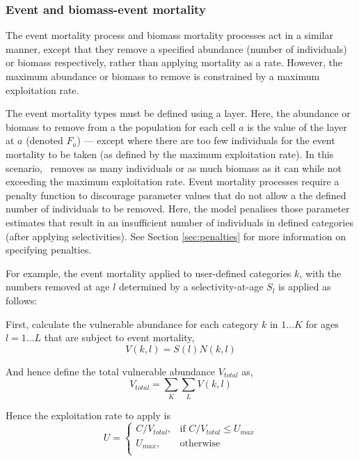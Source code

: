 \subsubsection*{Event and biomass-event mortality}

The event mortality process and biomass mortality processes act in a similar manner, except that they remove a specified abundance (number of individuals) or biomass respectively, rather than applying mortality as a rate. However, the maximum abundance or biomass to remove is constrained by a maximum exploitation rate.

The event mortality types must be defined using a layer. Here, the abundance or biomass to remove from a the population for each cell $a$ is the value of the layer at $a$ (denoted $F_a$) --- except where there are too few individuals for the event mortality to be taken (as defined by the maximum exploitation rate). In this scenario, \SPM\ removes as many individuals or as much biomass as it can while not exceeding the maximum exploitation rate. Event mortality processes require a penalty function to discourage parameter values that do not allow a the defined number of individuals to be removed. Here, the model penalises those parameter estimates that result in an insufficient number of individuals in defined categories (after applying selectivities). See Section \ref{sec:penalties} for more information on specifying penalties.

For example, the event mortality applied to user-defined categories $k$, with the numbers removed at age $l$ determined by a selectivity-at-age $S_l$ is applied as follows:

First, calculate the vulnerable abundance for each category $k$ in $1 \ldots K$ for ages $l = 1 \ldots L$ that are subject to event mortality,
\begin{equation}
  V(k,l) = S(l) N(k,l)
\end{equation}

And hence define the total vulnerable abundance $V_{total}$ as,
\begin{equation}
  V_{total}  = \sum\limits_K {\sum\limits_L {V(k,l)}} 
\end{equation}

Hence the exploitation rate to apply is 
\begin{equation}
U = \begin{cases}
  C/V_{total}, & \text{if $C/V_{total} \leq U_{max}$} \\
  U_{max}, & \text{otherwise}\\ 
  \end{cases} 
\end{equation}

